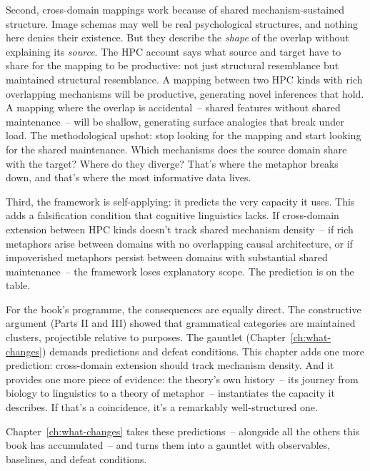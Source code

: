 Second, cross-domain mappings work because of shared mechanism-sustained structure. Image schemas may well be real psychological structures, and nothing here denies their existence. But they describe the \emph{shape} of the overlap without explaining its \emph{source}. The HPC account says what source and target have to share for the mapping to be productive: not just structural resemblance but maintained structural resemblance. A mapping between two HPC kinds with rich overlapping mechanisms will be productive, generating novel inferences that hold. A mapping where the overlap is accidental~-- shared features without shared maintenance~-- will be shallow, generating surface analogies that break under load. The methodological upshot: stop looking for the mapping and start looking for the shared maintenance. Which mechanisms does the source domain share with the target? Where do they diverge? That's where the metaphor breaks down, and that's where the most informative data lives.

Third, the framework is self-applying: it predicts the very capacity it uses. This adds a falsification condition that cognitive linguistics lacks. If cross-domain extension between HPC kinds doesn't track shared mechanism density~-- if rich metaphors arise between domains with no overlapping causal architecture, or if impoverished metaphors persist between domains with substantial shared maintenance~-- the framework loses explanatory scope. The prediction is on the table.

For the book's programme, the consequences are equally direct. The constructive argument (Parts II and III) showed that grammatical categories are maintained clusters, projectible relative to purposes. The gauntlet (Chapter~\ref{ch:what-changes}) demands predictions and defeat conditions. This chapter adds one more prediction: cross-domain extension should track mechanism density. And it provides one more piece of evidence: the theory's own history~-- its journey from biology to linguistics to a theory of metaphor~-- instantiates the capacity it describes. If that's a coincidence, it's a remarkably well-structured one.

Chapter~\ref{ch:what-changes} takes these predictions~-- alongside all the others this book has accumulated~-- and turns them into a gauntlet with observables, baselines, and defeat conditions.
